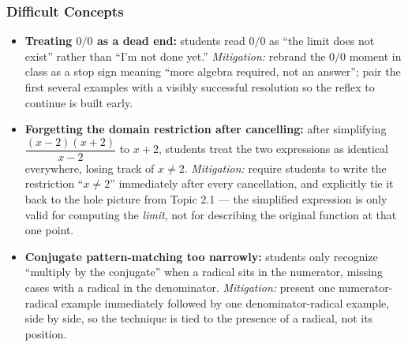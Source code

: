 \documentclass[11pt]{article}
\begin{document}
\subsubsection*{Difficult Concepts}
\begin{itemize}[leftmargin=*]
  \item \textbf{Treating $0/0$ as a dead end:} students read $0/0$ as ``the limit does not exist'' rather than ``I'm not done yet.'' \textit{Mitigation:} rebrand the $0/0$ moment in class as a stop sign meaning ``more algebra required, not an answer''; pair the first several examples with a visibly successful resolution so the reflex to continue is built early.
  \item \textbf{Forgetting the domain restriction after cancelling:} after simplifying $\dfrac{(x-2)(x+2)}{x-2}$ to $x+2$, students treat the two expressions as identical everywhere, losing track of $x\ne 2$. \textit{Mitigation:} require students to write the restriction ``$x\ne 2$'' immediately after every cancellation, and explicitly tie it back to the hole picture from Topic 2.1 --- the simplified expression is only valid for computing the \emph{limit}, not for describing the original function at that one point.
  \item \textbf{Conjugate pattern-matching too narrowly:} students only recognize ``multiply by the conjugate'' when a radical sits in the numerator, missing cases with a radical in the denominator. \textit{Mitigation:} present one numerator-radical example immediately followed by one denominator-radical example, side by side, so the technique is tied to the presence of a radical, not its position.
\end{itemize}
\end{document}
